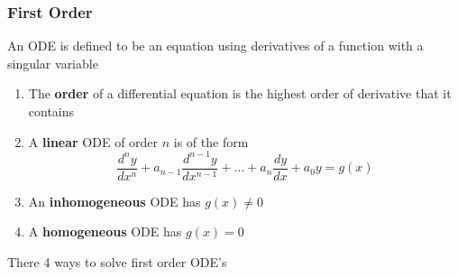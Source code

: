\documentclass[11pt,titlepage]{article}
\numberwithin{equation}{subsection}
\begin{document}
\subsubsection{First Order }
An ODE is defined to be an equation using derivatives of a function with a singular variable
\begin{enumerate}
    \item The \textbf{order} of a differential equation is the highest order of derivative that it contains
    \item A \textbf{linear} ODE of order $n$ is of the form
    \begin{equation}
        \frac{d^ny}{dx^n}+a_{n-1}\frac{d^{n-1}y}{dx^{n-1}}+\dots+a_n\frac{dy}{dx}+a_0y=g(x)
    \end{equation}
    \item An \textbf{inhomogeneous} ODE has $g(x)\neq0$
    \item A \textbf{homogeneous} ODE has $g(x)=0$
\end{enumerate}
There 4 ways to solve first order ODE's
\end{document}
